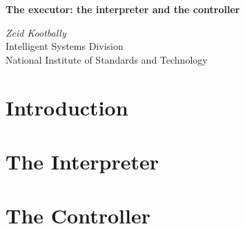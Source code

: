 \documentclass[12pt]{article}
\begin{document}
\begin{titlepage}
\begin{center}

\textbf{The executor: the interpreter and the controller}\\

\vspace{1.5cm} %

\textit{Zeid Kootbally}\\
Intelligent Systems Division\\
National Institute of Standards and Technology
                                                                                                                                                             \\

\end{center}
\end{titlepage}
\cleardoublepage

\tableofcontents
\cleardoublepage
{}
\listoffigures
\cleardoublepage
\section{Introduction}
\label{s:introduction}



\section{The Interpreter}
\label{s:interpreter}


 \section{The Controller}
 \label{s:controller}
 
\end{document}
